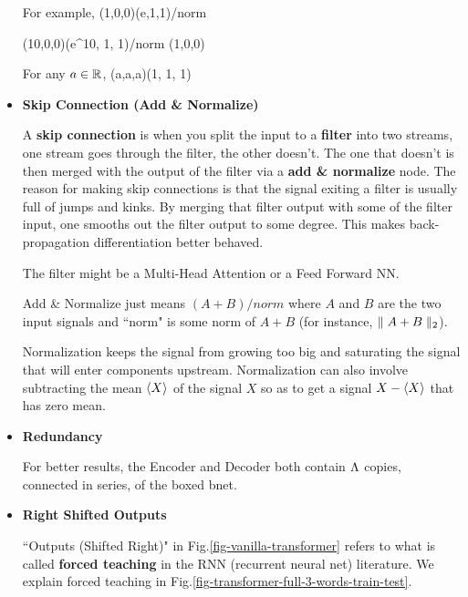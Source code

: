\begin{itemize}
For example,
\beq
(1,0,0)\rarrow (e,1,1)/norm
\eeq

\beq
(10,0,0)\rarrow (e^{10}, 1, 1)/norm \approx (1,0,0)
\eeq

For any $a\in{ \mathbb{R}}$,
\beq
(a,a,a)\rarrow {}(1, 1, 1)
\eeq


\item {\bf Skip Connection (Add \& Normalize)}

A {\bf skip connection} is when you split the
input to a {\bf filter} into two streams, one stream goes through
the filter, the other doesn't. The one that doesn't
is then merged with the output of the filter via a {\bf add \& normalize} node. The reason for making skip connections
is that the signal exiting a filter is usually full of
jumps and kinks. By merging that filter output
with some  of the filter input, one smooths out the filter output
to some degree. This makes back-propagation differentiation
better behaved.

The filter might be a Multi-Head Attention or a Feed Forward NN.

Add \& Normalize just means $(A + B)/norm$ where $A$ and $B$
are the two input signals and ``norm" is some norm of $A+B$ (for
instance, $\parallel A+B\parallel_2$).

Normalization keeps the signal from growing too big and saturating the signal that will enter components upstream.
Normalization can also involve subtracting the mean $\left\langle X\right\rangle$ of the signal $X$  so as to get a signal $X-\left\langle X\right\rangle$  that has zero mean.

%


\item {\bf Redundancy}

For better results, the Encoder
and Decoder both contain $\Lambda$ 
copies, connected in series, of the boxed bnet.

\item{\bf Right Shifted Outputs}

``Outputs (Shifted Right)" in Fig.\ref{fig-vanilla-transformer}
refers to what is called
{\bf forced teaching}
in the RNN (recurrent neural net) 
literature.
We explain forced teaching
in Fig.\ref{fig-transformer-full-3-words-train-test}.



\end{itemize}

